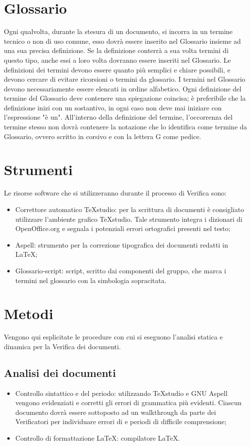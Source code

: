 \newpage
\section{Glossario}
\label{9.0}
Ogni qualvolta, durante la stesura di un documento, si incorra in un termine tecnico o non di uso comune, esso dovrà essere inserito nel Glossario insieme ad una sua precisa definizione. Se la definizione conterrà a sua volta termini di questo tipo, anche essi a loro volta dovranno essere inseriti nel Glossario.
Le definizioni dei termini devono essere quanto più semplici e chiare possibili, e devono cercare di evitare ricorsioni o termini da glossario.
I termini nel Glossario devono necessariamente essere elencati in ordine alfabetico.
Ogni definizione del termine del Glossario deve contenere una spiegazione coincisa; è preferibile che la definizione inizi con un sostantivo, in ogni caso non deve mai iniziare con l'espressione "è un".
All'interno della definizione del termine, l'occorrenza del termine stesso non dovrà contenere la notazione che lo identifica come termine da Glossario, ovvero scritto in corsivo e con la lettera G come pedice.

\newpage
\section{Strumenti}
\label{10.0}
Le risorse software che si utilizzeranno durante il processo di Verifica sono:
\begin{itemize}
\item Correttore automatico TeXstudio: per la scrittura di documenti è consigliato utilizzare l'ambiente grafico TeXstudio. Tale strumento integra i dizionari di OpenOffice.org e segnala i potenziali errori ortografici presenti nel testo;
\item Aspell: strumento per la correzione tipografica dei documenti redatti in \LaTeX ;
\item Glossario-script: script, scritto dai componenti del gruppo, che marca i termini nel glossario con la simbologia sopracitata.
\end{itemize}

\newpage
\section{Metodi}
\label{11.0}
Vengono qui esplicitate le procedure con cui si eseguono l'analisi statica e dinamica per la Verifica dei documenti.

\subsection{Analisi dei documenti}
\label{11.1}
\begin{itemize}
\item Controllo sintattico e del periodo:
utilizzando TeXstudio e GNU Aspell vengono evidenziati e corretti gli errori di
grammatica più evidenti. Ciascun documento dovrà essere sottoposto ad un walkthrough da parte dei Verificatori per individuare errori di  e periodi di difficile comprensione;
\item Controllo di formattazione \LaTeX:
compilatore \LaTeX.
\end{itemize}

